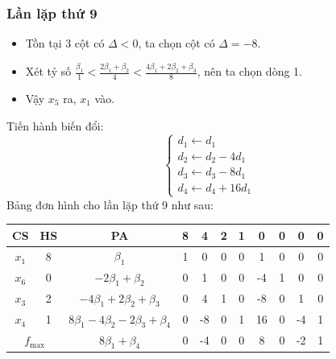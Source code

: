 \documentclass[12pt]{article}
\begin{document}
\subsubsection{Lần lặp thứ 9}
\begin{itemize}
\item Tồn tại 3 cột có $\Delta < 0$, ta chọn cột có $\Delta = -8$.
\item Xét tỷ số $\displaystyle \frac{\beta_1}{1} < \frac{2\beta_1 + \beta_2}{4} < \frac{4\beta_1 + 2\beta_2 + \beta_3}{8}$, nên ta chọn dòng 1.
\item Vậy $x_5$ ra, $x_1$ vào.
\end{itemize}
Tiến hành biến đổi:
$$
\left\{
\begin{array}{lll}
d_1 \leftarrow d_1 \\
d_2 \leftarrow d_2 - 4d_1\\
d_3 \leftarrow d_3 - 8d_1\\
d_4 \leftarrow d_4 + 16d_1
\end{array}
\right.
$$
Bảng đơn hình cho lần lặp thứ 9 như sau:
\begin{table}[H]
\centering
\begin{tabular}{|c|c|c|c|c|c|c|c|c|c|c|}
\hline
CS & HS & PA & 8 & 4 & 2 & 1 & 0 & 0 & 0 & 0 \\
\hline
$x_1$ & 8 & $\beta_1$ & 1 & 0 & 0 & 0 & 1 & 0 & 0 & 0 \\
$x_6$ & 0 & $-2\beta_1 + \beta_2$ & 0 & 1 & 0 & 0 & -4 & 1 & 0 & 0 \\
$x_3$ & 2 & $-4\beta_1 + 2\beta_2 + \beta_3$ & 0 & 4 & 1 & 0 & -8 & 0 & 1 & 0 \\
$x_4$ & 1 & $8\beta_1 - 4\beta_2 - 2\beta_3 + \beta_4$ & 0 & -8 & 0 & 1 & 16 & 0 & -4 & 1 \\
\hline
\multicolumn{2}{|c|}{$f_{\max}$}
& $8\beta_1 + \beta_4$ & 0 & -4 & 0 & 0 & 8 & 0 & -2 & 1 \\
\hline
\end{tabular}
\end{table}
\end{document}
